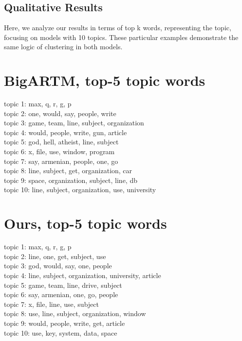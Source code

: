 \documentclass{article}
\begin{document}
\subsection{Qualitative Results}
Here, we analyze our results in terms of top k words, representing the topic, focusing on models with 10 topics. These particular examples demonstrate the same logic of clustering in both models.\\

\begin{multicols}{2}
\section*{BigARTM, top-5 topic words}
topic 1: max, q, r, g, p\\
topic 2: one, would, say, people, write\\
topic 3: game, team, line, subject, organization\\
topic 4: would, people, write, gun, article\\
topic 5: god, hell, atheist, line, subject\\
topic 6: x, file, use, window, program\\
topic 7: say, armenian, people, one, go\\
topic 8: line, subject, get, organization, car\\
topic 9: space, organization, subject, line, db\\
topic 10: line, subject, organization, use, university\\

\columnbreak

\section*{Ours, top-5 topic words}
topic 1: max, q, r, g, p\\
topic 2: line, one, get, subject, use\\
topic 3: god, would, say, one, people\\
topic 4: line, subject, organization, university, article\\
topic 5: game, team, line, drive, subject\\
topic 6: say, armenian, one, go, people\\
topic 7: x, file, line, use, subject\\
topic 8: use, line, subject, organization, window\\
topic 9: would, people, write, get, article\\
topic 10: use, key, system, data, space\\
\end{multicols}
\end{document}
